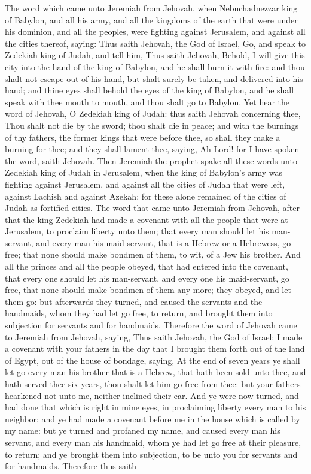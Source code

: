 The word which came unto Jeremiah from Jehovah, when Nebuchadnezzar king of Babylon, and all his army, and all the kingdoms of the earth that were under his dominion, and all the peoples, were fighting against Jerusalem, and against all the cities thereof, saying: Thus saith Jehovah, the God of Israel, Go, and speak to Zedekiah king of Judah, and tell him, Thus saith Jehovah, Behold, I will give this city into the hand of the king of Babylon, and he shall burn it with fire: and thou shalt not escape out of his hand, but shalt surely be taken, and delivered into his hand; and thine eyes shall behold the eyes of the king of Babylon, and he shall speak with thee mouth to mouth, and thou shalt go to Babylon. Yet hear the word of Jehovah, O Zedekiah king of Judah: thus saith Jehovah concerning thee, Thou shalt not die by the sword; thou shalt die in peace; and with the burnings of thy fathers, the former kings that were before thee, so shall they make a burning for thee; and they shall lament thee, saying, Ah Lord! for I have spoken the word, saith Jehovah.  Then Jeremiah the prophet spake all these words unto Zedekiah king of Judah in Jerusalem, when the king of Babylon’s army was fighting against Jerusalem, and against all the cities of Judah that were left, against Lachish and against Azekah; for these alone remained of the cities of Judah as fortified cities.  The word that came unto Jeremiah from Jehovah, after that the king Zedekiah had made a covenant with all the people that were at Jerusalem, to proclaim liberty unto them; that every man should let his man-servant, and every man his maid-servant, that is a Hebrew or a Hebrewess, go free; that none should make bondmen of them, to wit, of a Jew his brother. And all the princes and all the people obeyed, that had entered into the covenant, that every one should let his man-servant, and every one his maid-servant, go free, that none should make bondmen of them any more; they obeyed, and let them go: but afterwards they turned, and caused the servants and the handmaids, whom they had let go free, to return, and brought them into subjection for servants and for handmaids.  Therefore the word of Jehovah came to Jeremiah from Jehovah, saying, Thus saith Jehovah, the God of Israel: I made a covenant with your fathers in the day that I brought them forth out of the land of Egypt, out of the house of bondage, saying, At the end of seven years ye shall let go every man his brother that is a Hebrew, that hath been sold unto thee, and hath served thee six years, thou shalt let him go free from thee: but your fathers hearkened not unto me, neither inclined their ear. And ye were now turned, and had done that which is right in mine eyes, in proclaiming liberty every man to his neighbor; and ye had made a covenant before me in the house which is called by my name: but ye turned and profaned my name, and caused every man his servant, and every man his handmaid, whom ye had let go free at their pleasure, to return; and ye brought them into subjection, to be unto you for servants and for handmaids.  Therefore thus saith 
